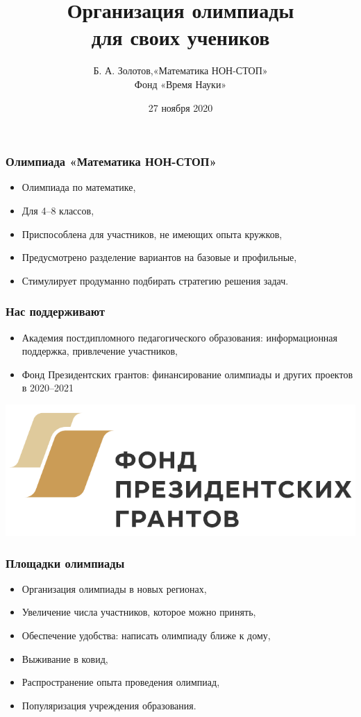 \documentclass[aspectratio=1610,12pt,notheorems]{beamer}
\title[Methodic keys to MNS]
    {\bfseries Организация олимпиады \\
	для своих учеников}
\author[\ ]
	{Б. А. Золотов,\quad «Математика НОН-СТОП»\\ \vspace{0.3cm}
		{\small Фонд «Время Науки»}}
\institute[\ ]{\ }
\date{27 ноября 2020}
\begin{document}
\frame{\titlepage}

\begin{frame} \frametitle{Олимпиада «Математика НОН-СТОП»}
\begin{itemize}
	\item Олимпиада по математике, \medskip
	\item Для 4–8 классов, \medskip
	\item Приспособлена для участников, не имеющих опыта кружков, \medskip
	\item Предусмотрено разделение вариантов на базовые и профильные, \medskip
	\item Стимулирует продуманно подбирать стратегию решения задач. \medskip
\end{itemize}
\end{frame}

\begin{frame} \frametitle{Нас поддерживают}
\begin{itemize}
	\item Академия постдипломного педагогического образования: информационная поддержка, привлечение участников, \medskip
	\item Фонд Президентских грантов: финансирование олимпиады и других проектов в 2020–2021
\end{itemize}

	\vspace{0.45cm}
	\begin{center}
		\includegraphics[scale=0.5]{fpg/fpg}
	\end{center}
\end{frame}





\begin{frame} \frametitle{Площадки олимпиады}
\begin{itemize}
	\item Организация олимпиады в новых регионах, \medskip
	\item Увеличение числа участников, которое можно принять, \medskip
	\item Обеспечение удобства: написать олимпиаду ближе к дому, \medskip
	\item Выживание в ковид, \medskip
	\item Распространение опыта проведения олимпиад, \medskip
	\item Популяризация учреждения образования. \medskip
\end{itemize}
\end{frame}
\end{document}
